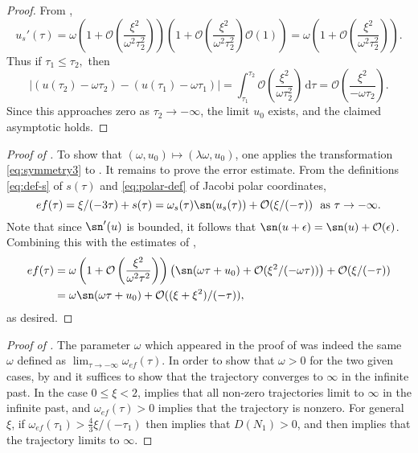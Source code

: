\begin{proof}
From , 
\[
u_{s}'(\tau)=\omega\left(1+\mathcal{O}\left(\frac{\xi^{2}}{\omega^{2}\tau_{2}^{2}}\right)\right)\left(1+\mathcal{O}\left(\frac{\xi^{2}}{\omega^{2}\tau_{2}^{2}}\right)\mathcal{O}\left(1\right)\right)=\omega\left(1+\mathcal{O}\left(\frac{\xi^{2}}{\omega^{2}\tau_{2}^{2}}\right)\right).
\]
 Thus if $\tau_{1}\leq\tau_{2},$ then 
\[
\left|(u(\tau_{2})-\omega\tau_{2})-(u(\tau_{1})-\omega\tau_{1})\right|=\int_{\tau_{1}}^{\tau_{2}}\mathcal{O}\left(\frac{\xi^{2}}{\omega\tau_{2}^{2}}\right)\,\mathrm{d}\tau=\mathcal{O}\left(\frac{\xi^{2}}{-\omega\tau_{2}}\right).
\]
 Since this approaches zero as $\tau_{2}\to-\infty$, the limit $u_{0}$ exists, and the claimed asymptotic holds.  
\end{proof}
%
\begin{proof}[Proof of ]
\label{pf:oscillatory} To show that $(\omega,u_{0})\mapsto(\lambda\omega,u_{0})$, one applies the transformation \eqref{eq:symmetry3} to . It remains to prove the error estimate. From the definitions \eqref{eq:def-s} of $s(\tau)$ and \eqref{eq:polar-def} of Jacobi polar coordinates, 
\[
ef(\tau)=\xi/(-3\tau)+s(\tau)=\omega_{s}(\tau)\sn(u_{s}(\tau))+\mathcal{O}(\xi/(-\tau))\ \textrm{ as }\tau\to-\infty.
\]
 Note that since $\sn'(u)$ is bounded, it follows that $\sn(u+\epsilon)=\sn(u)+\mathcal{O}(\epsilon)$. Combining this with the estimates of , 
\begin{align*}
ef(\tau) & =\omega\left(1+\mathcal{O}\left(\frac{\xi^{2}}{\omega^{2}\tau^{2}}\right)\right)\left(\sn(\omega\tau+u_{0})+\mathcal{O}(\xi^{2}/(-\omega\tau))\right)+\mathcal{O}(\xi/(-\tau))\\
 & =\omega\sn(\omega\tau+u_{0})+\mathcal{O}((\xi+\xi^{2})/(-\tau)),
\end{align*}
 as desired. 
\end{proof}
%
\begin{proof}[Proof of ]
\label{pf:approx-w} The parameter $\omega$ which appeared in the proof of  was indeed the same $\omega$ defined as $\lim_{\tau\to-\infty}\omega_{ef}(\tau)$. In order to show that $\omega>0$ for the two given cases, by  and  it suffices to show that the trajectory converges to $\bm{\infty}$ in the infinite past. In the case $0\leq\xi<2$,  implies that all non-zero trajectories limit to $\bm{\infty}$ in the infinite past, and $\omega_{ef}(\tau)>0$ implies that the trajectory is nonzero. For general $\xi$, if $\omega_{ef}(\tau_{1})>\tfrac{4}{3}\xi/(-\tau_{1})$ then  implies that $D(N_{1})>0$, and then  implies that the trajectory limits to $\bm{\infty}$. 
\end{proof}

